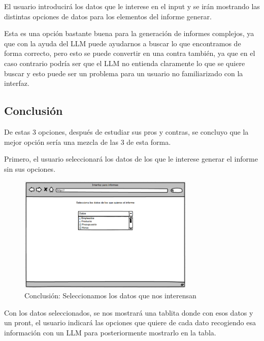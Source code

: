 El usuario introducirá los datos que le interese en el input y se irán mostrando las distintas opciones de datos para los elementos del informe generar.

Esta es una opción bastante buena para la generación de informes complejos, ya que con la ayuda del LLM puede ayudarnos a buscar lo que encontramos de forma correcto, pero esto se puede convertir en una contra también, ya que en el caso contrario podría ser que el LLM no entienda claramente lo que se quiere buscar y esto puede ser un problema para un usuario no familiarizado con la interfaz.

\subsection{Conclusión}

De estas 3 opciones, después de estudiar sus pros y contras, se concluyo que la mejor opción sería una mezcla de las 3 de esta forma.

Primero, el usuario seleccionará los datos de los que le interese generar el informe sin sus opciones.

\begin{figure}[hp!]
    \centering
    \includegraphics[width=0.75\textwidth]{imaxes/iteracion1.6.png}
    \caption{Conclusión: Seleccionamos los datos que nos interensan}
    \label{fig:iteracion1.6}
\end{figure}

Con los datos seleccionados, se nos mostrará una tablita donde con esos datos y un pront, el usuario indicará las opciones que quiere de cada dato recogiendo esa información con un LLM para posteriormente mostrarlo en la tabla.


